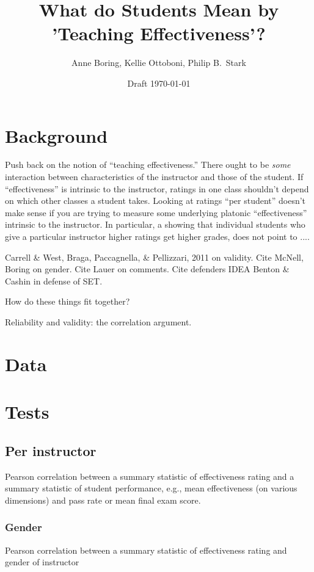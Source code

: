 \documentclass[12pt]{article}
\title{What do Students Mean by 'Teaching Effectiveness'?}
\author{Anne Boring, Kellie Ottoboni, Philip B.~Stark}
\date{Draft \today}
\newcommand{\todo}[1]{{\color{red}{TO DO: \sc #1}}}
\begin{document}
\maketitle

\section{Background}
Push back on the notion of ``teaching effectiveness.''
There ought to be \emph{some} interaction between characteristics of the
instructor and those of the student.
If ``effectiveness'' is intrinsic to the instructor, ratings in one class shouldn't depend on
which other classes a student takes.
Looking at ratings ``per student'' doesn't make sense if you are trying to
measure some underlying platonic ``effectiveness'' intrinsic to the instructor.
In particular,  a showing that individual students who give a particular instructor higher ratings
get higher grades, does not point to ....\todo{fix me}

Carrell \& West, Braga, Paccagnella, \& Pellizzari, 2011 on validity.
Cite McNell, Boring on gender.
Cite Lauer on comments.
Cite defenders IDEA Benton \& Cashin in defense of SET.  

How do these things fit together?

Reliability and validity: the correlation argument.

\section{Data}
\todo{Anne to provide description. Triads, etc.}

\section{Tests}

\subsection{Per instructor}
Pearson correlation between a summary statistic of effectiveness rating and a summary statistic
of student performance, e.g., mean effectiveness (on various dimensions) and pass rate or mean
final exam score.
\todo{code is ready.  Do we do all metrics?}

\subsubsection{Gender}
Pearson correlation between a summary statistic of effectiveness rating and gender of instructor
\todo{code is ready.  Do we do all metrics?}
\end{document}
